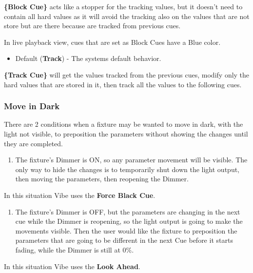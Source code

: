 \documentclass[
]{article}
\providecommand{\tightlist}{%
  \setlength{\itemsep}{0pt}\setlength{\parskip}{0pt}}
\begin{document}
\textbf{\{Block Cue\}} acts like a stopper for the tracking values, but it doesn't need to contain all hard values as it will avoid the tracking also on the values that are not store but are there because are tracked from previous cues.

In live playback view, cues that are set as Block Cues have a {Blue} color.

\begin{itemize}
\tightlist
\item
  Default (\textbf{Track}) - The systems default behavior.
\end{itemize}

\textbf{\{Track Cue\}} will get the values tracked from the previous cues, modify only the hard values that are stored in it, then track all the values to the following cues.

\hypertarget{move-in-dark}{%
\subsubsection{Move in Dark}\label{move-in-dark}}

There are 2 conditions when a fixture may be wanted to move in dark, with the light not visible, to preposition the parameters without showing the changes until they are completed.

\begin{enumerate}
\def\labelenumi{\arabic{enumi}.}
\tightlist
\item
  The fixture's Dimmer is ON, so any parameter movement will be visible. The only way to hide the changes is to temporarily shut down the light output, then moving the parameters, then reopening the Dimmer.
\end{enumerate}

In this situation Vibe uses the \textbf{Force Black Cue}.

\begin{enumerate}
\def\labelenumi{\arabic{enumi}.}
\setcounter{enumi}{1}
\tightlist
\item
  The fixture's Dimmer is OFF, but the parameters are changing in the next cue while the Dimmer is reopening, so the light output is going to make the movements visible. Then the user would like the fixture to preposition the parameters that are going to be different in the next Cue before it starts fading, while the Dimmer is still at 0\%.
\end{enumerate}

In this situation Vibe uses the \textbf{Look Ahead}.
\end{document}
